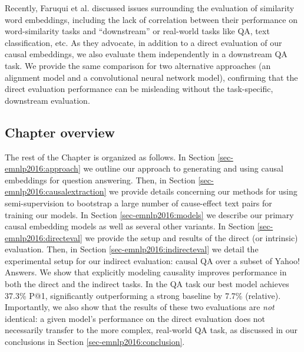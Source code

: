 Recently, Faruqui et al.\citeyear{faruqui2016problems} discussed issues surrounding the evaluation of similarity word embeddings, including the lack of correlation between their performance on word-similarity tasks and ``downstream'' or real-world tasks like QA, text classification, etc.  As they advocate, in addition to a direct evaluation of our causal embeddings, we also evaluate them independently in a downstream QA task.  We provide the same comparison for two alternative approaches (an alignment model and a convolutional neural network model), confirming that the direct evaluation performance can be misleading without the task-specific, downstream evaluation.

\subsection{Chapter overview}

The rest of the Chapter is organized as follows.  In Section \ref{sec-emnlp2016:approach} we outline our approach to generating and using causal embeddings for question answering.  Then, in Section \ref{sec-emnlp2016:causalextraction} we provide details concerning our methods for using semi-supervision to bootstrap a large number of cause-effect text pairs for training our models.  In Section \ref{sec-emnlp2016:models} we describe our primary causal embedding models as well as several other variants.  In Section \ref{sec-emnlp2016:directeval} we provide the setup and results of the direct (or intrinsic) evaluation.  Then, in Section \ref{sec-emnlp2016:indirecteval} we detail the experimental setup for our indirect evaluation: causal QA over a subset of Yahoo! Answers.  We show that explicitly modeling causality improves performance in both the direct and the indirect tasks. In the QA task our best model achieves 37.3\% P@1, significantly outperforming a strong baseline by 7.7\% (relative). 
Importantly, we also show that the results of these two evaluations are \emph{not} identical: a given model's performance on the direct evaluation does not necessarily transfer to the more complex, real-world QA task, as discussed in our conclusions in Section \ref{sec-emnlp2016:conclusion}.


%
